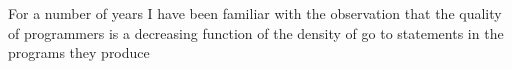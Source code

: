 \begin{epigrafe}
  For a number of years I have been familiar with the observation that the quality of programmers is a decreasing function of the density of go to statements in the programs they produce \\
\end{epigrafe}